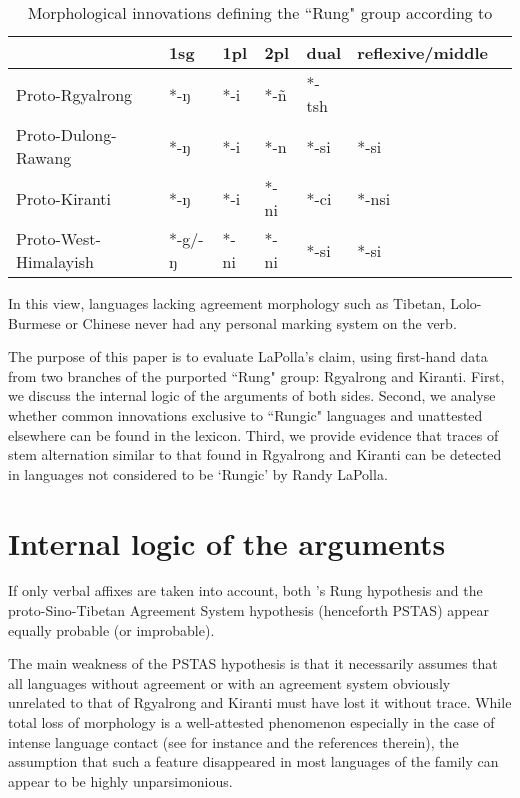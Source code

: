 \documentclass[oldfontcommands,oneside,a4paper,11pt]{article}
\begin{document}
\begin{table}[H] 
\caption{Morphological innovations defining the ``Rung" group according to \citet{lapolla03}}
\label{tab:rung1}
\begin{tabular}{lllllll} 
\toprule
  &   	1sg  &   	1pl  &   	2pl  &   	dual  &   	reflexive/middle  \\   
\midrule
Proto-Rgyalrong  &   	*-ŋ  &   	*-i  &   	*-ñ  &   	*-tsh  &   	  \\   
Proto-Dulong-Rawang  &   	*-ŋ  &   	*-i  &   	*-n  &   	*-si  &   	*-si  \\   
Proto-Kiranti  &   	*-ŋ  &   	*-i  &   	*-ni  &   	*-ci  &   	*-nsi  \\   
Proto-West-Himalayish  &   	*-g/-ŋ  &   	*-ni  &   	*-ni  &   	*-si  &   	*-si  \\   
\bottomrule
\end{tabular}
\end{table}
In this view, languages lacking agreement morphology such as Tibetan, Lolo-Burmese or Chinese never had any personal marking system on the verb. 


The purpose of this paper is to evaluate LaPolla's claim, using first-hand data from   two branches of the purported ``Rung" group: Rgyalrong and Kiranti. First, we   discuss the internal logic of the arguments of both sides. Second, we analyse whether common innovations exclusive to ``Rungic" languages and unattested elsewhere can be found in the lexicon. Third, we provide evidence that traces of stem alternation similar to that found in Rgyalrong and Kiranti can be detected in  languages not considered to be  `Rungic' by Randy LaPolla.
 

\section{Internal logic of the arguments}

If only verbal affixes are taken into account,  both \citet{lapolla03}'s Rung hypothesis and the proto-Sino-Tibetan Agreement System hypothesis (henceforth PSTAS) appear equally probable (or improbable). 

The main weakness of the PSTAS hypothesis is that it necessarily assumes that all languages without agreement or with an agreement system obviously unrelated to that of Rgyalrong and Kiranti must have lost it without trace. While total loss of morphology is a well-attested phenomenon especially in the case of intense language contact (see  \citealt{delancey10replacement} for instance and the references therein), the assumption that such a feature disappeared in most languages of the family can appear to be highly unparsimonious.
\end{document}
